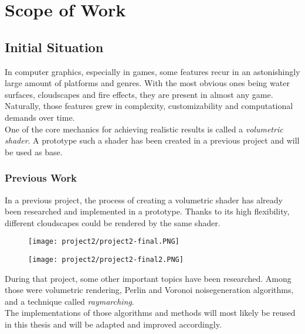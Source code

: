 \section{Scope of Work}

\subsection{Initial Situation}
In computer graphics, especially in games, some features recur in an astonishingly large amount of platforms and genres.
With the most obvious ones being water surfaces, cloudscapes and fire effects, they are present in almost any game. 
Naturally, those features grew in complexity, customizability and computational demands over time.
\\
One of the core mechanics for achieving realistic results is called a \emph{\gls{volumetric} \gls{shader}}.
A prototype such a \gls{shader} has been created in a previous project and will be used as base.

\subsubsection{Previous Work}
In a previous project, the process of creating a \gls{volumetric} \gls{shader} has already been researched and implemented in a prototype. Thanks to its high flexibility, different cloudscapes could be rendered by the same shader.

\begin{figure}[ht]
    \centering
        \begin{minipage}{0.47\linewidth}
            \texttt{[image: project2/project2-final.PNG]}
        \end{minipage}
    \hfill
        \begin{minipage}{0.47\linewidth}
            \texttt{[image: project2/project2-final2.PNG]}
        \end{minipage}  
\end{figure}

\noindent
During that project, some other important topics have been researched. Among those were \gls{volumetric} rendering, Perlin and Voronoi \gls{noisegeneration} algorithms, and a technique called \emph{\gls{raymarching}}.
\\
The implementations of those algorithms and methods will most likely be reused in this thesis and will be adapted and improved accordingly.

